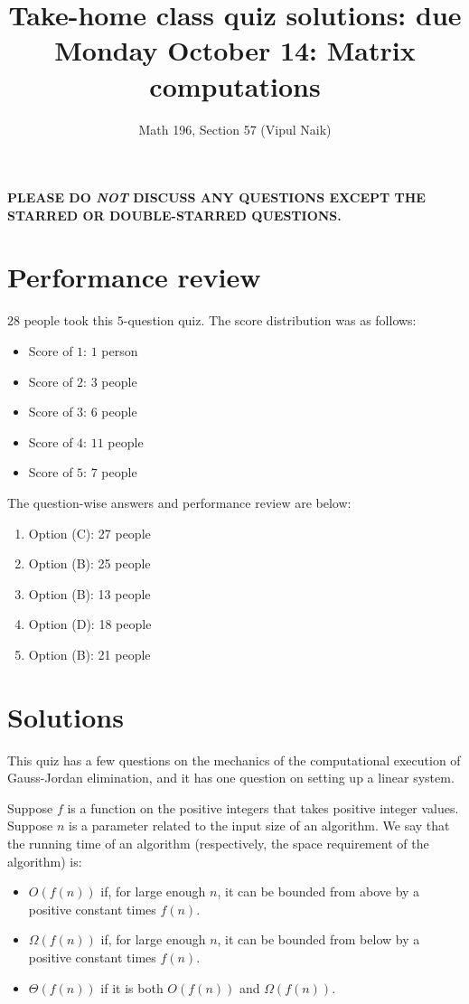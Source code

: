 \documentclass[10pt]{amsart}
\title{Take-home class quiz solutions: due Monday October 14: Matrix computations}
\author{Math 196, Section 57 (Vipul Naik)}
\begin{document}
\maketitle

{\bf PLEASE DO {\em NOT} DISCUSS ANY QUESTIONS EXCEPT THE STARRED OR DOUBLE-STARRED QUESTIONS.}

\section{Performance review}

28 people took this $5$-question quiz. The score distribution was as
follows:

\begin{itemize}
\item Score of $1$: $1$ person
\item Score of $2$: $3$ people
\item Score of $3$: $6$ people
\item Score of $4$: $11$ people
\item Score of $5$: $7$ people
\end{itemize}

The question-wise answers and performance review are below:

\begin{enumerate}
\item Option (C): 27 people
\item Option (B): 25 people
\item Option (B): 13 people
\item Option (D): 18 people
\item Option (B): 21 people
\end{enumerate}

\section{Solutions}

This quiz has a few questions on the mechanics of the computational
execution of Gauss-Jordan elimination, and it has one question on
setting up a linear system.

Suppose $f$ is a function on the positive integers that takes positive
integer values. Suppose $n$ is a parameter related to the input size
of an algorithm. We say that the running time of an algorithm
(respectively, the space requirement of the algorithm) is:

\begin{itemize}
\item $O(f(n))$ if, for large enough $n$, it can be bounded from above
  by a positive constant times $f(n)$.
\item $\Omega(f(n))$ if, for large enough $n$, it can be bounded from
  below by a positive constant times $f(n)$.
\item $\Theta(f(n))$ if it is both $O(f(n))$ and $\Omega(f(n))$.
\end{itemize}
\end{document}

